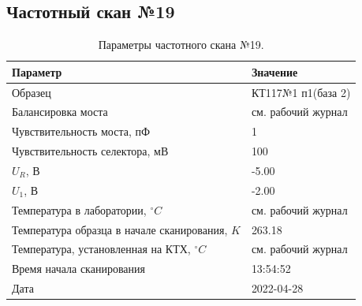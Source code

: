 \subsection{Частотный скан №19}
\begin{table}[!ht]
    \centering
    \caption{Параметры частотного скана №19.}
    \begin{tabular}{|l|l|}
        \hline
        Параметр                                       & Значение                  \\ \hline
        Образец                                        & КТ117№1 п1(база 2)        \\ \hline
        Балансировка моста                             & см. рабочий журнал        \\ \hline
        Чувствительность моста, пФ                     & 1                         \\ \hline
        Чувствительность селектора, мВ                 & 100                       \\ \hline
        $U_R$, В                                       & -5.00                     \\ \hline
        $U_1$, В                                       & -2.00                     \\ \hline
        Температура в лаборатории, $^\circ C$          & см. рабочий журнал        \\ \hline
        Температура образца в начале сканирования, $K$ & 263.18                    \\ \hline
        Температура, установленная на КТХ, $^\circ C$  & см. рабочий журнал        \\ \hline
        Время начала сканирования                      & 13:54:52                  \\ \hline
        Дата                                           & 2022-04-28                \\ \hline
    \end{tabular}
    \label{table:frequency_scan_19}
\end{table}

